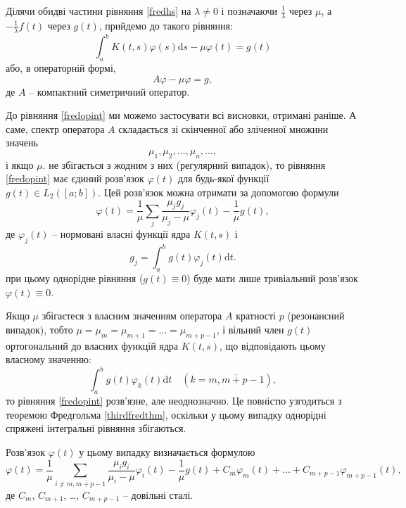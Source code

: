 \documentclass[14pt,twoside]{extreport}
\theoremstyle{mystyle}
\numberwithin{equation}{chapter}
\begin{document}
Ділячи обидві частини рівняння \eqref{fredhs} на $\lambda \neq 0$ і позначаючи $\frac{1}{\lambda}$ через $\mu$, а $- \frac{1}{\lambda} f(t)$ через $g(t)$, прийдемо до такого рівняння:
\begin{equation}
 \int_a^b K(t, s) \varphi(s) \mathrm{d}s - \mu \varphi(t) = g(t)
\end{equation}
або, в операторній формі,
\begin{equation}\label{fredopint}
 A\varphi - \mu \varphi = g,
\end{equation}
де $A$ -- компактний симетричний оператор.

До рівняння \eqref{fredopint} ми можемо застосувати всі висновки, отримані раніше. А саме, спектр оператора $A$ складається зі скінченної або зліченної множини значень
\[
 \mu_1, \mu_2, \ldots, \mu_n, \ldots,
\]
і якщо $\mu$. не збігається з жодним з них (регулярний випадок), то рівняння \eqref{fredopint} має єдиний розв'язок $\varphi(t)$ для будь-якої функції $g(t) \in L_2([a; b])$. Цей розв'язок можна отримати за допомогою формули
\begin{equation}\label{solhs}
 \varphi(t) = \frac{1}{\mu} \sum_{j}\frac{\mu_j g_j}{\mu_j - \mu}\varphi_j(t) - \frac{1}{\mu} g(t),
\end{equation}
де $\varphi_j(t)$ -- нормовані власні функції ядра $K(t, s)$ і
\[
 g_j = \int_a^b g(t) \varphi_j(t) \mathrm{d}t.
\]
при цьому однорідне рівняння ($g(t) \equiv 0$) буде мати лише тривіальний розв'язок $\varphi(t) \equiv 0$.

Якщо $\mu$ збігаєтеся з власним значенням оператора $A$ кратності $p$ (резонансний випадок), тобто $\mu = \mu_m = \mu_{m+1} = \ldots = \mu_{m+p-1}$, і вільний член $g(t)$ ортогональний до власних функцій ядра $K(t, s)$, що відповідають цьому власному значенню:
\begin{equation}
 \int_a^b g(t) \varphi_k(t)\mathrm{d}t \quad (k=\overline{m, m+p-1}),
\end{equation}
то рівняння \eqref{fredopint} розв'язне, але неоднозначно. Це повністю узгодиться з теоремою Фредгольма \ref{thirdfredthm}, оскільки у цьому випадку однорідні спряжені інтегральні рівняння збігаються.

Розв'язок $\varphi(t)$ у цьому випадку визначається формулою
\begin{equation}\label{ressolhs}
 \varphi(t) = \frac{1}{\mu} \sum_{i\neq \overline{m, m+p-1}} \frac{\mu_i g_i}{\mu_i - \mu} \varphi_i(t) - \frac{1}{\mu} g(t) + C_m \varphi_m(t) + \ldots + C_{m+p-1} \varphi_{m+p-1} (t),
\end{equation}
де $C_m$, $C_{m+1}$, \ldots , $C_{m+p-1}$ -- довільні сталі.
\end{document}
